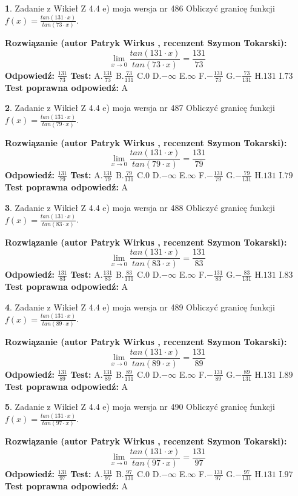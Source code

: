 \documentclass[12pt, a4paper]{article}
\theoremstyle{definition} %
\newtheorem{zad}{}
\newcommand{\zadStart}[1]{\begin{zad}#1\newline}
\newcommand{\zadStop}{\end{zad}}
\newcommand{\rozwStart}[2]{\noindent \textbf{Rozwiązanie (autor #1 , recenzent #2): }\newline}
\newcommand{\rozwStop}{\newline}
\newcommand{\odpStart}{\noindent \textbf{Odpowiedź:}\newline}
\newcommand{\odpStop}{\newline}
\newcommand{\testStart}{\noindent \textbf{Test:}\newline}
\newcommand{\testStop}{\newline}
\newcommand{\kluczStart}{\noindent \textbf{Test poprawna odpowiedź:}\newline}
\newcommand{\kluczStop}{\newline}
\begin{document}
\zadStart{Zadanie z Wikieł Z 4.4 e) moja wersja nr 486}
Obliczyć granicę funkcji $f(x)=\frac{tan(131\cdot x)}{tan(73\cdot x)}$.
\zadStop
\rozwStart{Patryk Wirkus}{Szymon Tokarski}
$$\lim\limits_{x\to 0}\frac{tan(131\cdot x)}{tan(73\cdot x)}=
\frac{131}{73}$$
\rozwStop
\odpStart
$\frac{131}{73}$
\odpStop
\testStart
A.$\frac{131}{73}$
B.$\frac{73}{131}$
C.$0$
D.$-\infty$
E.$\infty$
F.$-\frac{131}{73}$
G.$-\frac{73}{131}$
H.$131$
I.$73$
\testStop
\kluczStart
A
\kluczStop



\zadStart{Zadanie z Wikieł Z 4.4 e) moja wersja nr 487}
Obliczyć granicę funkcji $f(x)=\frac{tan(131\cdot x)}{tan(79\cdot x)}$.
\zadStop
\rozwStart{Patryk Wirkus}{Szymon Tokarski}
$$\lim\limits_{x\to 0}\frac{tan(131\cdot x)}{tan(79\cdot x)}=
\frac{131}{79}$$
\rozwStop
\odpStart
$\frac{131}{79}$
\odpStop
\testStart
A.$\frac{131}{79}$
B.$\frac{79}{131}$
C.$0$
D.$-\infty$
E.$\infty$
F.$-\frac{131}{79}$
G.$-\frac{79}{131}$
H.$131$
I.$79$
\testStop
\kluczStart
A
\kluczStop



\zadStart{Zadanie z Wikieł Z 4.4 e) moja wersja nr 488}
Obliczyć granicę funkcji $f(x)=\frac{tan(131\cdot x)}{tan(83\cdot x)}$.
\zadStop
\rozwStart{Patryk Wirkus}{Szymon Tokarski}
$$\lim\limits_{x\to 0}\frac{tan(131\cdot x)}{tan(83\cdot x)}=
\frac{131}{83}$$
\rozwStop
\odpStart
$\frac{131}{83}$
\odpStop
\testStart
A.$\frac{131}{83}$
B.$\frac{83}{131}$
C.$0$
D.$-\infty$
E.$\infty$
F.$-\frac{131}{83}$
G.$-\frac{83}{131}$
H.$131$
I.$83$
\testStop
\kluczStart
A
\kluczStop



\zadStart{Zadanie z Wikieł Z 4.4 e) moja wersja nr 489}
Obliczyć granicę funkcji $f(x)=\frac{tan(131\cdot x)}{tan(89\cdot x)}$.
\zadStop
\rozwStart{Patryk Wirkus}{Szymon Tokarski}
$$\lim\limits_{x\to 0}\frac{tan(131\cdot x)}{tan(89\cdot x)}=
\frac{131}{89}$$
\rozwStop
\odpStart
$\frac{131}{89}$
\odpStop
\testStart
A.$\frac{131}{89}$
B.$\frac{89}{131}$
C.$0$
D.$-\infty$
E.$\infty$
F.$-\frac{131}{89}$
G.$-\frac{89}{131}$
H.$131$
I.$89$
\testStop
\kluczStart
A
\kluczStop



\zadStart{Zadanie z Wikieł Z 4.4 e) moja wersja nr 490}
Obliczyć granicę funkcji $f(x)=\frac{tan(131\cdot x)}{tan(97\cdot x)}$.
\zadStop
\rozwStart{Patryk Wirkus}{Szymon Tokarski}
$$\lim\limits_{x\to 0}\frac{tan(131\cdot x)}{tan(97\cdot x)}=
\frac{131}{97}$$
\rozwStop
\odpStart
$\frac{131}{97}$
\odpStop
\testStart
A.$\frac{131}{97}$
B.$\frac{97}{131}$
C.$0$
D.$-\infty$
E.$\infty$
F.$-\frac{131}{97}$
G.$-\frac{97}{131}$
H.$131$
I.$97$
\testStop
\kluczStart
A
\kluczStop
\end{document}
